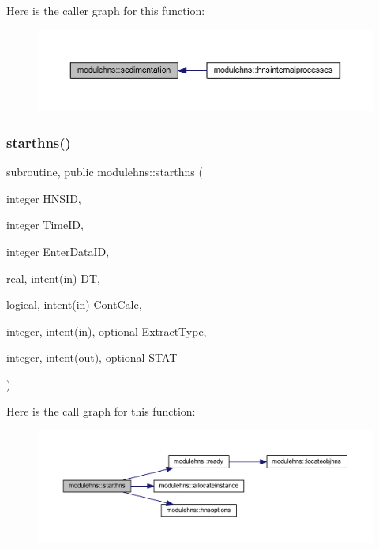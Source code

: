 Here is the caller graph for this function\+:\nopagebreak
\begin{figure}[H]
\begin{center}
\leavevmode
\includegraphics[width=350pt]{namespacemodulehns_ab96db95d39d4bc3d33b5266fe71250e6_icgraph}
\end{center}
\end{figure}
\mbox{\label{namespacemodulehns_a65e1246a501100818d485a4f330fa1d7}} 
\subsubsection{\texorpdfstring{starthns()}{starthns()}}
{\footnotesize\ttfamily subroutine, public modulehns\+::starthns (\begin{DoxyParamCaption}\item[{integer}]{H\+N\+S\+ID,  }\item[{integer}]{Time\+ID,  }\item[{integer}]{Enter\+Data\+ID,  }\item[{real, intent(in)}]{DT,  }\item[{logical, intent(in)}]{Cont\+Calc,  }\item[{integer, intent(in), optional}]{Extract\+Type,  }\item[{integer, intent(out), optional}]{S\+T\+AT }\end{DoxyParamCaption})}

Here is the call graph for this function\+:\nopagebreak
\begin{figure}[H]
\begin{center}
\leavevmode
\includegraphics[width=350pt]{namespacemodulehns_a65e1246a501100818d485a4f330fa1d7_cgraph}
\end{center}
\end{figure}
\mbox{\label{namespacemodulehns_a4966ebd0f80ed38b932eafaa93d15db4}} 
